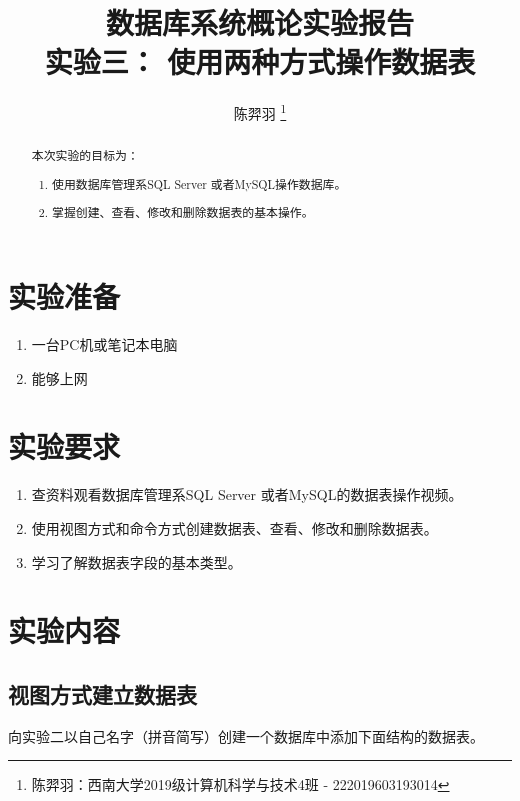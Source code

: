 \documentclass[a4paper,UTF8,heading=false,12pt]{article}
\newcommand\subtitle[1]{{\small #1}}
\begin{document}
    \title{
        数据库系统概论实验报告 \\
        \subtitle{实验三： 使用两种方式操作数据表}
    }
    \author{陈羿羽 \thanks{陈羿羽：西南大学2019级计算机科学与技术4班 - 222019603193014}}
    \maketitle

    \begin{abstract}
        本次实验的目标为：
        \begin{enumerate}
            \item 使用数据库管理系SQL Server 或者MySQL操作数据库。
            \item 掌握创建、查看、修改和删除数据表的基本操作。
        \end{enumerate}
    \end{abstract}

    \newpage

    \section{实验准备}

    \begin{enumerate}
        \item 一台PC机或笔记本电脑
        \item 能够上网
    \end{enumerate}

    \section{实验要求}

    \begin{enumerate}
        \item 查资料观看数据库管理系SQL Server 或者MySQL的数据表操作视频。
        \item 使用视图方式和命令方式创建数据表、查看、修改和删除数据表。
        \item 学习了解数据表字段的基本类型。
    \end{enumerate}

    \section{实验内容}

    \subsection{视图方式建立数据表}
    向实验二以自己名字（拼音简写）创建一个数据库中添加下面结构的数据表。
\end{document}
